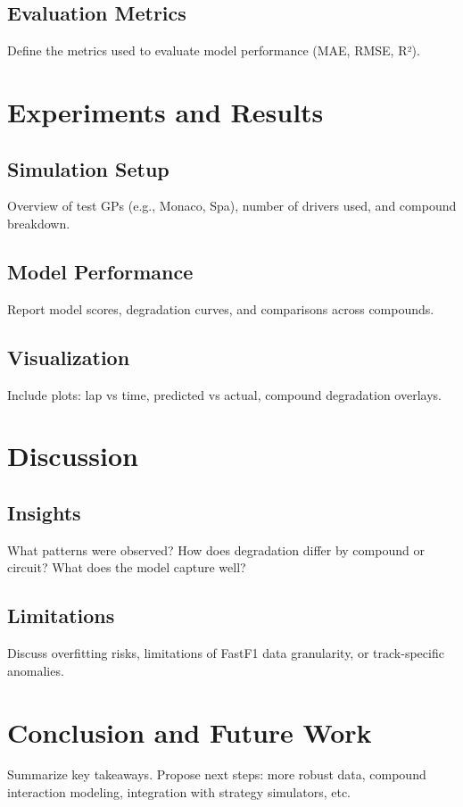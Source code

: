 \documentclass[12pt]{article}
\begin{document}
\subsection{Evaluation Metrics}
Define the metrics used to evaluate model performance (MAE, RMSE, R²).

\section{Experiments and Results}
\subsection{Simulation Setup}
Overview of test GPs (e.g., Monaco, Spa), number of drivers used, and compound breakdown.

\subsection{Model Performance}
Report model scores, degradation curves, and comparisons across compounds.

\subsection{Visualization}
Include plots: lap vs time, predicted vs actual, compound degradation overlays.

\section{Discussion}
\subsection{Insights}
What patterns were observed? How does degradation differ by compound or circuit? What does the model capture well?

\subsection{Limitations}
Discuss overfitting risks, limitations of FastF1 data granularity, or track-specific anomalies.

\section{Conclusion and Future Work}
Summarize key takeaways. Propose next steps: more robust data, compound interaction modeling, integration with strategy simulators, etc.
\end{document}
